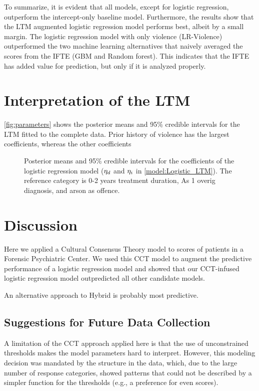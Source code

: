 \documentclass[a4paper,11pt]{article}
\begin{document}
To summarize, it is evident that all models, except for logistic regression, outperform the intercept-only baseline model.
Furthermore, the results show that the LTM augmented logistic regression model performs best, albeit by a small margin.
The logistic regression model with only violence (LR-Violence) outperformed the two machine learning alternatives that naively averaged the scores from the IFTE (GBM and Random forest).
This indicates that the IFTE has added value for prediction, but only if it is analyzed properly.

\section{Interpretation of the LTM}
\autoref{fig:parameters} shows the posterior means and 95\% credible intervals for the LTM fitted to the complete data.
Prior history of violence has the largest coefficients, whereas the other coefficients 
\begin{figure}
    \centering
    
    \caption{Posterior means and 95\% credible intervals for the coefficients of the logistic regression model ($\eta_{d}$ and $\eta_{i}$ in \autoref{model:Logistic_LTM}). The reference category is 0-2 years treatment duration, As 1 overig diagnosis, and arson as offence.}
    \label{fig:parameters}
\end{figure}

\section{Discussion}
Here we applied a Cultural Consensus Theory model to scores of patients in a Forensic Psychiatric Center.
We used this CCT model to augment the predictive performance of a logistic regression model and showed that our CCT-infused logistic regression model outpredicted all other candidate models.

An alternative approach to 
Hybrid is probably most predictive.

\subsection{Suggestions for Future Data Collection}
A limitation of the CCT approach applied here is that the use of unconstrained thresholds makes the model parameters hard to interpret.
However, this modeling decision was mandated by the structure in the data, which, due to the large number of response categories, showed patterns that could not be described by a simpler function for the thresholds (e.g., a preference for even scores).
\end{document}

